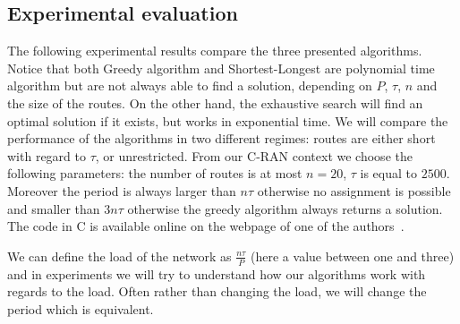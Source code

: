 \documentclass[a4paper,10pt]{article}
\begin{document}
{%
%        
%       


    \subsection{Experimental evaluation}\label{sec:exp_PAZL}
      
      The following experimental results compare the three presented algorithms.
      Notice that both Greedy algorithm and Shortest-Longest are polynomial time algorithm but are not always able to find a solution, depending on $P$, $\tau$, $n$ and the size of the routes. On the other hand, the exhaustive search will find an optimal solution if it exists, but works in exponential time. We will compare the performance of the algorithms in two different regimes: routes are either short with regard to $\tau$, or unrestricted.
      From our C-RAN context we choose the following parameters: the number of routes 
      is at most $n = 20$, $\tau$ is equal to $2500$. Moreover the period is always larger than $n\tau$ otherwise no assignment is possible and smaller than $3n\tau$ otherwise the greedy algorithm always returns a solution. 
      The code in C is available online on the webpage of one of the authors~\cite{webpage}.
      
      We can define the load of the network as $\frac{n\tau}{P}$ (here a value between one and three) and in experiments we will try to understand how our algorithms work with regards to the load. Often rather than changing the load, we will change the period which is equivalent. 
      

}
\end{document}
